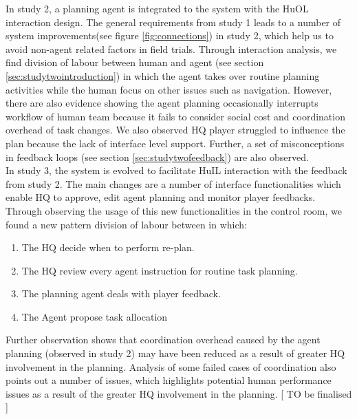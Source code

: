 In study 2, a planning agent is integrated to the system with the HuOL interaction design. The general requirements from study 1 leads to a number of system improvements(see figure \ref{fig:connections}) in study 2, which help us to avoid non-agent related factors in field trials. Through interaction analysis, we find division of labour between human and agent (see section \ref{sec:studytwointroduction}) in which the agent takes over routine planning activities while the human focus on other issues such as navigation. However, there are also evidence showing the agent planning occasionally interrupts workflow of human team because it fails to consider social cost and coordination overhead of task changes. We also observed HQ player struggled to influence the plan because the lack of interface level support. Further, a set of misconceptions in feedback loops (see section \ref{sec:studytwofeedback}) are also observed.\\

In study 3, the system is evolved to facilitate HuIL interaction with the feedback from study 2. The main changes are a number of interface functionalities which enable HQ to approve, edit agent planning and monitor player feedbacks. Through observing the usage of this new functionalities in the control room, we found a new pattern division of labour between in which:
	\begin{enumerate}
	 \item The HQ decide when to perform re-plan.
	 \item The HQ review every agent instruction for routine task planning.
	 \item The planning agent deals with player feedback.
	 \item The Agent propose task allocation
	\end{enumerate}
	
Further observation shows that coordination overhead caused by the agent planning (observed in study 2) may have been reduced as a result of greater HQ involvement in the planning. Analysis of some failed cases of coordination also points out a number of issues, which highlights potential human performance issues as a result of the greater HQ involvement in the planning. [ TO be finalised ]  \\

